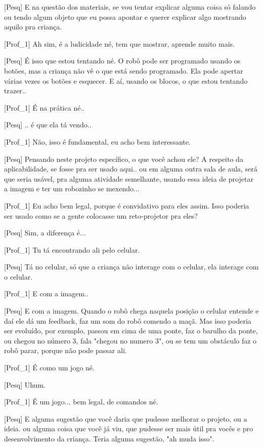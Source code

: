[Pesq] E na questão dos materiais, se vou tentar explicar alguma coisa só falando ou tendo algum objeto que eu possa apontar e querer explicar algo mostrando aquilo pra criança. 

[Prof\_1] Ah sim, é a ludicidade né, tem que mostrar, aprende muito mais. 
    
[Pesq] É isso que estou tentando né. O robô pode ser programado usando os botões, mas a criança não vê o que está sendo programado. Ela pode apertar várias vezes os botões e esquecer. E aí, usando os blocos, o que estou tentando trazer..

[Prof\_1] É na prática né..
    
[Pesq] .. é que ela tá vendo..

[Prof\_1] Não, isso é fundamental, eu acho bem interessante.
    
[Pesq] Pensando neste projeto específico, o que você achou ele? A respeito da aplicabilidade, se fosse pra ser usado aqui.. ou em alguma outra sala de aula, será que seria usável, pra alguma atividade semelhante, usando essa ideia de projetar a imagem e ter um robozinho se mexendo...

[Prof\_1] Eu acho bem legal, porque é convidativo para eles assim. Isso poderia ser usado como se a gente colocasse um reto-projetor pra eles?
    
[Pesq] Sim, a diferença é...

[Prof\_1] Tu tá encontrando ali pelo celular.
    
[Pesq] Tá no celular, só que a criança não interage com o celular, ela interage com o celular.

[Prof\_1] E com a imagem..
    
[Pesq] E com a imagem. Quando o robô chega naquela posição o celular entende e daí ele dá um feedback, faz um som do robô comendo a maçã. Mas isso poderia ser evoluído, por exemplo, passou em cima de uma ponte, faz o barulho da ponte, ou chegou no número 3, fala "chegou no numero 3", ou se tem um obstáculo faz o robô parar, porque não pode passar ali.

[Prof\_1] É como um jogo né.
    
[Pesq] Uhum.

[Prof\_1] É um jogo... bem legal, de comandos né.
    
[Pesq] E alguma sugestão que você daria que pudesse melhorar o projeto, ou a ideia. ou alguma coisa que você já viu, que pudesse ser mais útil pra vocês e pro desenvolvimento da criança. Teria alguma sugestão, "ah muda isso".

